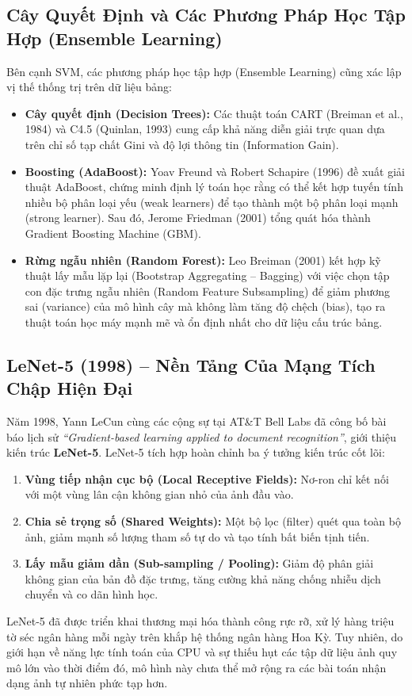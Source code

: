 \documentclass[12pt,a4paper]{report}
\begin{document}
\subsection{Cây Quyết Định và Các Phương Pháp Học Tập Hợp (Ensemble Learning)}
Bên cạnh SVM, các phương pháp học tập hợp (Ensemble Learning) cũng xác lập vị thế thống trị trên dữ liệu bảng:
\begin{itemize}[leftmargin=1.2cm]
    \item \textbf{Cây quyết định (Decision Trees):} Các thuật toán CART (Breiman et al., 1984) và C4.5 (Quinlan, 1993) cung cấp khả năng diễn giải trực quan dựa trên chỉ số tạp chất Gini và độ lợi thông tin (Information Gain).
    \item \textbf{Boosting (AdaBoost):} Yoav Freund và Robert Schapire (1996) đề xuất giải thuật AdaBoost, chứng minh định lý toán học rằng có thể kết hợp tuyến tính nhiều bộ phân loại yếu (weak learners) để tạo thành một bộ phân loại mạnh (strong learner). Sau đó, Jerome Friedman (2001) tổng quát hóa thành Gradient Boosting Machine (GBM).
    \item \textbf{Rừng ngẫu nhiên (Random Forest):} Leo Breiman (2001) kết hợp kỹ thuật lấy mẫu lặp lại (Bootstrap Aggregating -- Bagging) với việc chọn tập con đặc trưng ngẫu nhiên (Random Feature Subsampling) để giảm phương sai (variance) của mô hình cây mà không làm tăng độ chệch (bias), tạo ra thuật toán học máy mạnh mẽ và ổn định nhất cho dữ liệu cấu trúc bảng.
\end{itemize}

\subsection{LeNet-5 (1998) -- Nền Tảng Của Mạng Tích Chập Hiện Đại}
Năm 1998, Yann LeCun cùng các cộng sự tại AT\&T Bell Labs đã công bố bài báo lịch sử \textit{“Gradient-based learning applied to document recognition”}, giới thiệu kiến trúc \textbf{LeNet-5}. LeNet-5 tích hợp hoàn chỉnh ba ý tưởng kiến trúc cốt lõi:
\begin{enumerate}[leftmargin=1.2cm]
    \item \textbf{Vùng tiếp nhận cục bộ (Local Receptive Fields):} Nơ-ron chỉ kết nối với một vùng lân cận không gian nhỏ của ảnh đầu vào.
    \item \textbf{Chia sẻ trọng số (Shared Weights):} Một bộ lọc (filter) quét qua toàn bộ ảnh, giảm mạnh số lượng tham số tự do và tạo tính bất biến tịnh tiến.
    \item \textbf{Lấy mẫu giảm dần (Sub-sampling / Pooling):} Giảm độ phân giải không gian của bản đồ đặc trưng, tăng cường khả năng chống nhiễu dịch chuyển và co dãn hình học.
\end{enumerate}
LeNet-5 đã được triển khai thương mại hóa thành công rực rỡ, xử lý hàng triệu tờ séc ngân hàng mỗi ngày trên khắp hệ thống ngân hàng Hoa Kỳ. Tuy nhiên, do giới hạn về năng lực tính toán của CPU và sự thiếu hụt các tập dữ liệu ảnh quy mô lớn vào thời điểm đó, mô hình này chưa thể mở rộng ra các bài toán nhận dạng ảnh tự nhiên phức tạp hơn.
\end{document}

